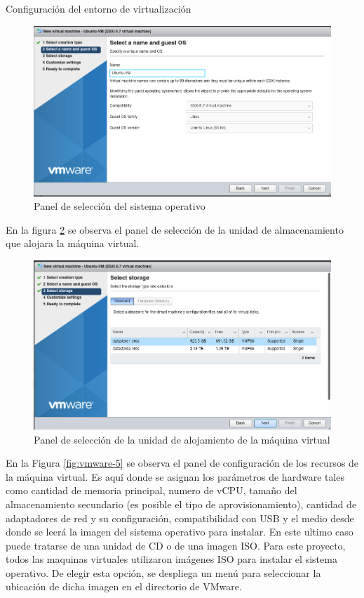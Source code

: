 \begin{section}{Configuración del entorno de virtualización}
         \begin{figure}[H]
          \centering
           \includegraphics[width=1\textwidth]{./Anexos-imagenes/vmware-3.png}
            \caption{Panel de selección del sistema operativo}
            \label{fig:vmware-3}
        \end{figure}
        \FloatBarrier
        En la figura \ref{fig:vmware-4} se observa el panel de selección de la unidad de almacenamiento que alojara la máquina virtual.
         \begin{figure}[H]
          \centering
           \includegraphics[width=1\textwidth]{./Anexos-imagenes/vmware-4.png}
            \caption{Panel de selección de la unidad de alojamiento de la máquina virtual}
            \label{fig:vmware-4}
        \end{figure}
        \FloatBarrier
        En la Figura \ref{fig:vmware-5} se observa el panel de configuración de los recursos de la máquina virtual. Es aquí donde se asignan los parámetros de hardware tales como cantidad de memoria principal, numero de vCPU, tamaño del almacenamiento secundario (es posible el tipo de aprovisionamiento), cantidad de adaptadores de red y su configuración, compatibilidad con USB y el medio desde donde se leerá la imagen del sistema operativo para instalar. En este ultimo caso puede tratarse de una unidad de CD o de una imagen ISO. Para este proyecto, todos las maquinas virtuales utilizaron imágenes ISO para instalar el sistema operativo. De elegir esta opción, se despliega un menú para seleccionar la ubicación de dicha imagen en el directorio de VMware.

\end{section}
